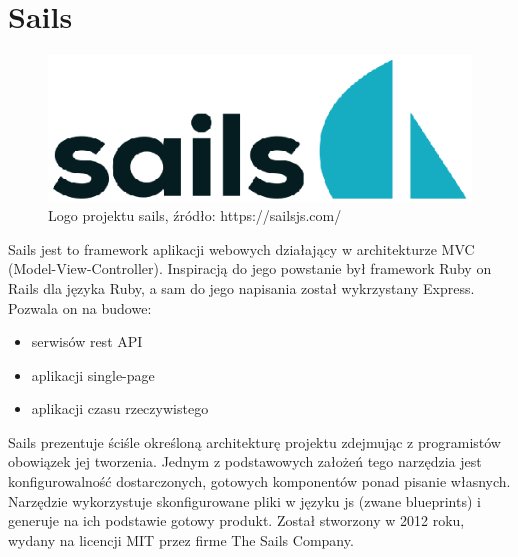 \documentclass[12pt]{report}
\begin{document}
   \section{Sails}
    \begin{figure}[!hb]
      \centering
      \includegraphics[width=\textwidth,height=\textheight,keepaspectratio]{logo_sails.png} 
      \caption{Logo projektu sails, źródło: https://sailsjs.com/}
    \end{figure}
    Sails jest to framework aplikacji webowych działający w architekturze MVC (Model-View-Controller).
    Inspiracją do jego powstanie był framework Ruby on Rails dla języka Ruby, a sam do jego napisania został wykrzystany Express.
    Pozwala on na budowe:
     \begin{itemize}
      \item serwisów rest API
      \item aplikacji single-page 
      \item aplikacji czasu rzeczywistego
    \end{itemize} 
    Sails prezentuje ściśle określoną architekturę projektu zdejmując z programistów obowiązek jej tworzenia.
    Jednym z podstawowych założeń tego narzędzia jest konfigurowalność dostarczonych, gotowych komponentów ponad pisanie własnych.
    Narzędzie wykorzystuje skonfigurowane pliki w języku js (zwane blueprints) i generuje na ich podstawie gotowy produkt.
    Został stworzony w 2012 roku, wydany na licencji MIT przez firme The Sails Company.
\end{document}
